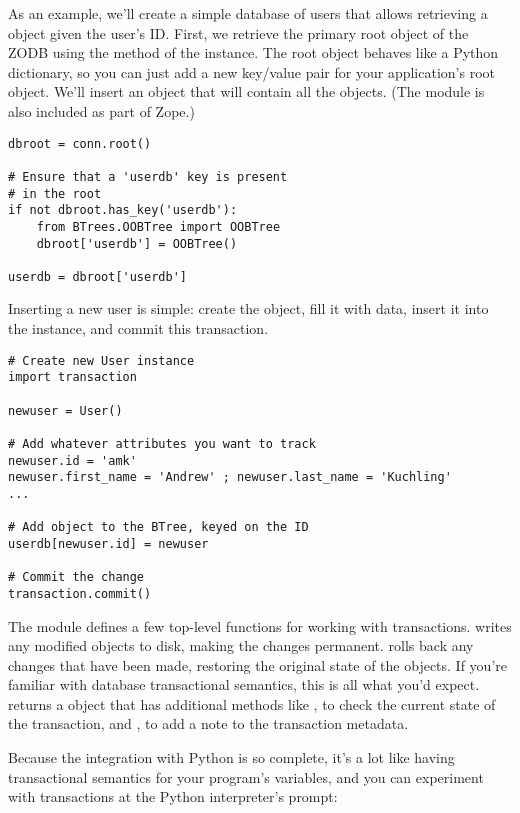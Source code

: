 As an example, we'll create a simple database of users that allows
retrieving a  object given the user's ID.  First, we
retrieve the primary root object of the ZODB using the 
method of the  instance.  The root object behaves
like a Python dictionary, so you can just add a new key/value pair for
your application's root object.  We'll insert an  object
that will contain all the  objects.  (The
 module is also included as part of Zope.)

\begin{verbatim}
dbroot = conn.root()

# Ensure that a 'userdb' key is present 
# in the root
if not dbroot.has_key('userdb'):
    from BTrees.OOBTree import OOBTree
    dbroot['userdb'] = OOBTree()

userdb = dbroot['userdb']
\end{verbatim}

Inserting a new user is simple: create the  object, fill
it with data, insert it into the  instance, and commit
this transaction.

\begin{verbatim}# Create new User instance
import transaction

newuser = User() 

# Add whatever attributes you want to track
newuser.id = 'amk' 
newuser.first_name = 'Andrew' ; newuser.last_name = 'Kuchling'
...

# Add object to the BTree, keyed on the ID
userdb[newuser.id] = newuser

# Commit the change
transaction.commit()
\end{verbatim}

The  module defines a few top-level functions for
working with transactions.   writes any modified
objects to disk, making the changes permanent.   rolls
back any changes that have been made, restoring the original state of
the objects.  If you're familiar with database transactional
semantics, this is all what you'd expect.   returns a
 object that has additional methods like
, to check the current state of the transaction, and
, to add a note to the transaction metadata.

Because the integration with Python is so complete, it's a lot like
having transactional semantics for your program's variables, and you
can experiment with transactions at the Python interpreter's prompt:

